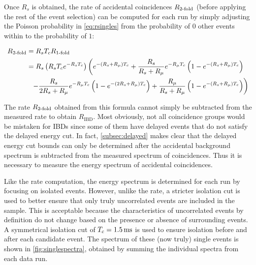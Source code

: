 Once $R_s$ is obtained, the rate of accidental coincidences $R_{\text{\ensuremath{2}-fold}}$
(before applying the rest of the event selection)
can be computed for each run
by simply adjusting the Poisson probability in \cref{eq:rsingles}
from the probability of $0$ other events within \tc{}
to the probability of $1$:

\begin{align}
    \label{eq:racc}
    \begin{split}
        R_{\text{\fold{2}}} &= R_s\tc R_{\text{\fold{1}}} \\
                   &= R_s \left(R_s\tc e^{-R_s\tc}\right)
          \left(
              e^{-(R_s + R_\mu)\tc} +
              \frac{R_s}{R_s+R_\mu} e^{-R_\mu\tc}
              \left(
                  1 - e^{-(R_s + R_\mu)\tc}
              \right)
          \right. \\
          &\ \ %
          \left. - \frac{R_s}{2R_s + R_\mu} e^{-R_\mu\tc}
              \left(
                  1 - e^{-(2R_s + R_\mu)\tc}
              \right) +
              \frac{R_\mu}{R_s + R_\mu}
              \left(
                  1 - e^{-(R_s + R_\mu)\tc}
              \right)
          \right)
    \end{split}
\end{align}

The rate $R_{\text{\ensuremath{2}-fold}}$ obtained from this formula
cannot simply be subtracted from the measured  rate
to obtain $R_{\text{IBD}}$.
Most obviously, not all  coincidence groups would be
mistaken for IBDs since some of them have delayed events that
do not satisfy the delayed energy cut.
In fact, \cref{subsec:delayed} makes clear that the delayed energy cut bounds
can only be determined after the accidental background spectrum
is subtracted from the measured spectrum of  coincidences.
Thus it is necessary to measure the energy spectrum of
accidental coincidences.

Like the rate computation, the energy spectrum is determined for each run
by focusing on isolated events.
However, unlike the rate, a stricter isolation cut is used
to better ensure that only truly uncorrelated events are included in the sample.
This is acceptable because the characteristics of uncorrelated events
by definition do not change based on the presence or absence
of surrounding events.
A symmetrical isolation cut of $T_c=\SI{1.5}{\milli\second}$ is used
to ensure isolation before and after each candidate event.
The spectrum of these (now truly) single events is shown in \cref{fig:singlespectra},
obtained by summing the individual spectra from each data run.

